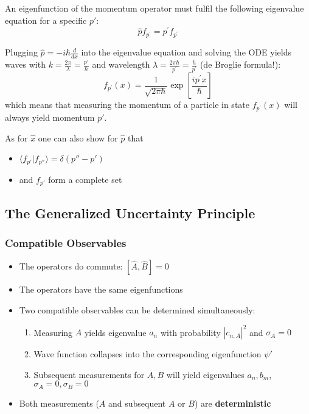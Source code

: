 
An eigenfunction of the momentum operator must fulfil the following eigenvalue equation for a specific $p'$:
\begin{equation*}
    \hat{p}f_{p^{\prime}}=p^{\prime}f_{p^{\prime}}
\end{equation*}


Plugging $\hat{p}=-i\hbar \frac{d}{dx}$ into the eigenvalue equation and solving the ODE yields waves with
$k=\frac{2 \pi}{\lambda}=\frac{p'}{\hbar}$ and wavelength $\lambda=\frac{2\pi\hbar}{p^{\prime}}=\frac{h}{p^{\prime}}$
(de Broglie formula!):
\begin{equation*}
    f_{p^{\prime}}(x)=\frac{1}{\sqrt{2\pi\hbar}}\exp\left[\frac{ip^{\prime}x}{\hbar}\right]
\end{equation*}
which means that measuring the momentum of a particle in state $f_{p^{\prime}}(x)$ will always yield momentum $p'$.


As for $\hat{x}$ one can also show for $\hat{p}$ that
\begin{itemize}
    \item $\langle f_{p'}|f_{p''}\rangle=\delta(p''-p')$
    \item and $f_{p'}$ form a complete set
\end{itemize}


\subsection{The Generalized Uncertainty Principle}

\subsubsection{Compatible Observables}

\begin{itemize}
    \item The operators do commute: $[\widehat{A}, \widehat{B}] = 0$
    \item The operators have the same eigenfunctions
    \item Two compatible observables can be determined simultaneously:
          \begin{enumerate}
              \item Measuring $A$ yields eigenvalue $a_n$ with probability $|c_{n,A}|^2$ and $\sigma_A=0$
              \item Wave function collapses into the corresponding eigenfunction $\psi'$
              \item Subsequent measurements for $A,B$ will yield eigenvalues $a_n, b_m$, $\sigma_A=0, \sigma_B=0$
          \end{enumerate}
    \item Both measurements ($A$ and subsequent $A$ or $B$) are \textbf{deterministic}
\end{itemize}

